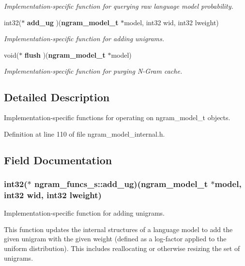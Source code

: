 \begin{DoxyCompactItemize}
\begin{DoxyCompactList}\small\item\em Implementation-\/specific function for querying raw language model probability. \end{DoxyCompactList}\item 
int32($\ast$ {\bf add\-\_\-ug} )({\bf ngram\-\_\-model\-\_\-t} $\ast$model, int32 wid, int32 lweight)
\begin{DoxyCompactList}\small\item\em Implementation-\/specific function for adding unigrams. \end{DoxyCompactList}\item 
void($\ast$ {\bf flush} )({\bf ngram\-\_\-model\-\_\-t} $\ast$model)\label{structngram__funcs__s_a7abf2864db9c8e8d1d5909ea92144ffe}

\begin{DoxyCompactList}\small\item\em Implementation-\/specific function for purging N-\/\-Gram cache. \end{DoxyCompactList}\end{DoxyCompactItemize}


\subsection{Detailed Description}
Implementation-\/specific functions for operating on ngram\-\_\-model\-\_\-t objects. 

Definition at line 110 of file ngram\-\_\-model\-\_\-internal.\-h.



\subsection{Field Documentation}
\subsubsection[{add\-\_\-ug}]{\setlength{\rightskip}{0pt plus 5cm}int32($\ast$ ngram\-\_\-funcs\-\_\-s\-::add\-\_\-ug)({\bf ngram\-\_\-model\-\_\-t} $\ast$model, int32 wid, int32 lweight)}\label{structngram__funcs__s_a6d553c95c7f4da4993f2b9df757ac016}


Implementation-\/specific function for adding unigrams. 

This function updates the internal structures of a language model to add the given unigram with the given weight (defined as a log-\/factor applied to the uniform distribution). This includes reallocating or otherwise resizing the set of unigrams.

